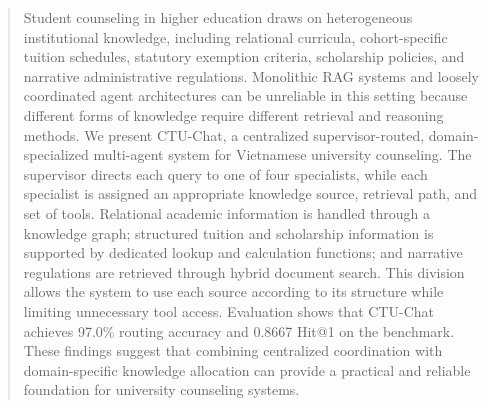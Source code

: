 \begin{abstract}
Student counseling in higher education draws on heterogeneous institutional knowledge, including relational curricula, cohort-specific tuition schedules, statutory exemption criteria, scholarship policies, and narrative administrative regulations. Monolithic RAG systems and loosely coordinated agent architectures can be unreliable in this setting because different forms of knowledge require different retrieval and reasoning methods. We present CTU-Chat, a centralized supervisor-routed, domain-specialized multi-agent system for Vietnamese university counseling. The supervisor directs each query to one of four specialists, while each specialist is assigned an appropriate knowledge source, retrieval path, and set of tools. Relational academic information is handled through a knowledge graph; structured tuition and scholarship information is supported by dedicated lookup and calculation functions; and narrative regulations are retrieved through hybrid document search. This division allows the system to use each source according to its structure while limiting unnecessary tool access. Evaluation shows that CTU-Chat achieves 97.0\% routing accuracy and 0.8667 Hit@1 on the benchmark. These findings suggest that combining centralized coordination with domain-specific knowledge allocation can provide a practical and reliable foundation for university counseling systems.

\end{abstract}
